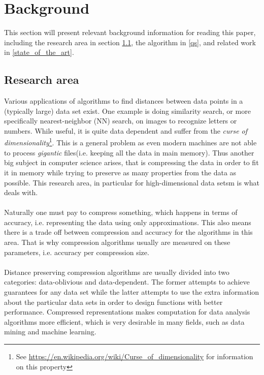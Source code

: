 \section{Background}
\label{background}
This section will present relevant background information for reading this paper, including the research area in section \ref{research_area}, the \qs{} algorithm in \ref{qs}, and related work in \ref{state_of_the_art}.

\subsection{Research area}
\label{research_area}
Various applications of algorithms to find distances between data points in a (typically large) data set exist. One example is doing similarity search, or more specifically nearest-neighbor (NN) search, on images to recognize letters or numbers. While useful, it is quite data dependent and suffer from the \textit{curse of dimensionality}\footnote{See \url{https://en.wikipedia.org/wiki/Curse_of_dimensionality} for information on this property}. This is a general problem as even modern machines are not able to process \textit{gigantic} files(i.e. keeping all the data in main memory). Thus another big subject in computer science arises, that is compressing the data in order to fit it in memory while trying to preserve as many properties from the data as possible. This research area, in particular for high-dimensional data setsm is what \qs{} deals with.
\\
\\
Naturally one must pay to compress something, which happens in terms of accuracy, i.e. representing the data using only approximations. This also means there is a trade off between compression and accuracy for the algorithms in this area. That is why compression algorithms usually are measured on these parameters, i.e. accuracy per compression size.
\\
\\
Distance preserving compression algorithms are usually divided into two categories: data-oblivious and data-dependent. The former attempts to achieve guarantees for any data set while the latter attempts to use the extra information about the particular data sets in order to design functions with better performance. Compressed representations makes computation for data analysis algorithms more efficient, which is very desirable in many fields, such as data mining and machine learning\cite{stan15}.

